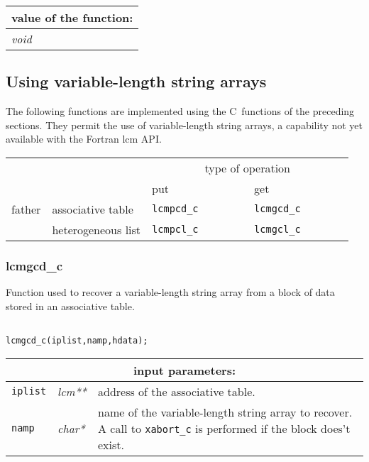 \noindent
\begin{tabular}{|p{4.0cm}|p{11cm}|}
\hline
\multicolumn{2}{|c|}{\bf value of the function:} \\
\hline
{\it void} &  \\
\hline
\end{tabular}

\vskip 0.8cm

\subsection{Using variable-length string arrays}

The following functions are implemented using the C~functions of the preceding sections. They
permit the use of variable-length string arrays, a capability not yet available with the Fortran
{\sc lcm} API.

\vskip 0.4cm

\begin{center}
\begin{tabular}{|c|l|l|l|}
\cline{3-4}
\multicolumn{2}{c|}{} & \multicolumn{2}{c|}{type of operation} \\
\cline{3-4}
\multicolumn{2}{c|}{} & put~~~~~~~~~~~~~ & get~~~~~~~~~~~~~ \\
\hline
father & associative table & {\tt lcmpcd\_c} & {\tt lcmgcd\_c} \\
\cline{2-4}
       & heterogeneous list & {\tt lcmpcl\_c} & {\tt lcmgcl\_c} \\
\hline
\end{tabular}
\end{center}

\subsubsection{lcmgcd\_c}\label{sect:lcmgcdc}

Function used to recover a variable-length string array from a block of data stored in an associative table.

\begin{verbatim}

lcmgcd_c(iplist,namp,hdata);
\end{verbatim}

\noindent
\begin{tabular}{|p{1.5cm}|p{2cm}|p{11cm}|}
\hline
\multicolumn{3}{|c|}{\bf input parameters:} \\
\hline
{\tt iplist} & {\it lcm**} & address of the associative table. \\
\hline
{\tt namp} & {\it char*} &  name of the variable-length string array
to recover. A call to {\tt xabort\_c} is performed if the block does't exist. \\
\hline
\end{tabular}

